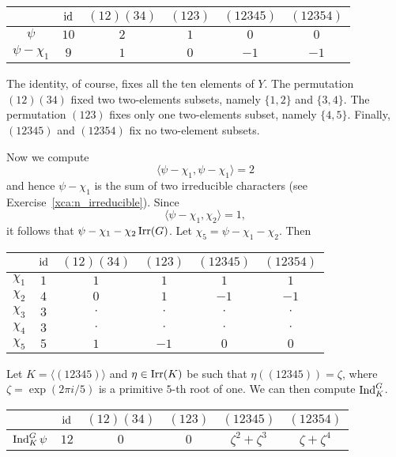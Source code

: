 \bigskip 
\begin{center}
        \begin{tabular}{|c|ccccc|}
        \hline  
         & $\operatorname{id}$ & $(12)(34)$ & $(123)$ & $(12345)$ & $(12354)$\\
        \hline 
        $\psi$ & $10$ & $2$ & $1$ & $0$ & $0$\\
        $\psi-\chi_1$ & $9$ & $1$ & $0$ & $-1$ & $-1$\\
        \hline 
    \end{tabular}
\end{center}
\bigskip 

The identity, of course, fixes all the ten elements
of $Y$. The permutation 
$(12)(34)$ fixed two two-elements subsets, namely
$\{1,2\}$ and $\{3,4\}$. The permutation 
$(123)$ fixes only one two-elements subset, namely
$\{4,5\}$. Finally, $(12345)$ and 
$(12354)$ fix no two-element subsets. 

Now we compute 
\[
\langle \psi-\chi_1,\psi-\chi_1\rangle=2
\]
and hence $\psi-\chi_1$ is the sum of two irreducible
characters (see Exercise~\ref{xca:n_irreducible}). Since
\[
\langle \psi-\chi_1,\chi_2\rangle=1,
\]
it follows that $\psi-\chi_1-\chi_2\operatorname{Irr}(G)$. Let 
$\chi_5=\psi-\chi_1-\chi_2$. Then

\bigskip 
\begin{center}
        \begin{tabular}{|c|ccccc|}
        \hline  
         & $\operatorname{id}$ & $(12)(34)$ & $(123)$ & $(12345)$ & $(12354)$\\
        \hline 
        $\chi_1$ & $1$ & $1$ & $1$ & $1$ & $1$\\
        $\chi_2$ & $4$ & $0$ & $1$ & $-1$ & $-1$\\
        $\chi_3$ & $3$ & $\cdot$ & $\cdot$ & $\cdot$& $\cdot$\\
        $\chi_4$ & $3$ & $\cdot$ & $\cdot$ & $\cdot$& $\cdot$\\
        $\chi_5$ & $5$ & $1$ & $-1$ & $0$& $0$\\
        \hline 
    \end{tabular}
\end{center}
\bigskip 

Let $K=\langle(12345)\rangle$ and 
$\eta\in\operatorname{Irr}(K)$ be such that $\eta((12345))=\zeta$, where
$\zeta=\exp(2\pi i/5)$ is a primitive $5$-th root of one. We can then compute 
$\operatorname{Ind}_K^G$. 

\bigskip 
\begin{center}
        \begin{tabular}{|c|ccccc|}
        \hline  
         & $\operatorname{id}$ & $(12)(34)$ & $(123)$ & $(12345)$ & $(12354)$\\
         \hline 
         $\operatorname{Ind}_K^G\psi$ & $12$ & $0$ & $0$ & $\zeta^2+\zeta^3$ & $\zeta+\zeta^4$\\
         \hline 
\end{tabular}
\end{center}
\bigskip 

